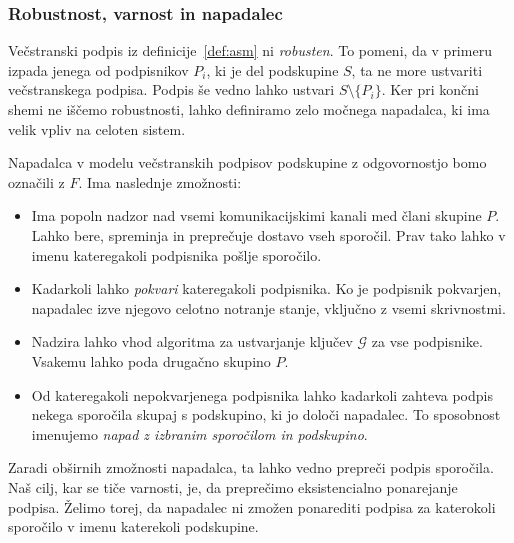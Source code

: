 \documentclass[isrm2, tisk]{fmfdelo}
\begin{document}
\subsubsection{Robustnost, varnost in napadalec}
Večstranski podpis iz definicije~\ref{def:asm} ni \textit{robusten}. To pomeni, da v primeru izpada
jenega od podpisnikov $P_i$, ki je del podskupine $S$, ta ne more ustvariti večstranskega podpisa.
Podpis še vedno lahko ustvari $S \setminus \{P_i\}$. Ker pri končni shemi ne iščemo robustnosti,
lahko definiramo zelo močnega napadalca, ki ima velik vpliv na celoten sistem.
\begin{definicija}
\label{def:asm-napadalec}
    Napadalca v modelu večstranskih podpisov podskupine z odgovornostjo bomo označili z $F$. Ima
    naslednje zmožnosti:
    \begin{itemize}
        \item Ima popoln nadzor nad vsemi komunikacijskimi kanali med člani skupine $P$. Lahko bere,
            spreminja in preprečuje dostavo vseh sporočil. Prav tako lahko v imenu kateregakoli
            podpisnika pošlje sporočilo.
        \item Kadarkoli lahko \textit{pokvari} kateregakoli podpisnika. Ko je podpisnik pokvarjen,
            napadalec izve njegovo celotno notranje stanje, vključno z vsemi skrivnostmi.
        \item Nadzira lahko vhod algoritma za ustvarjanje ključev $\mathcal{G}$ za vse podpisnike.
            Vsakemu lahko poda drugačno skupino $P$.
        \item Od kateregakoli nepokvarjenega podpisnika lahko kadarkoli zahteva podpis nekega sporočila
            skupaj s podskupino, ki jo določi napadalec. To sposobnost imenujemo
            \textit{napad z izbranim sporočilom in podskupino}.
    \end{itemize}
\end{definicija}

Zaradi obširnih zmožnosti napadalca, ta lahko vedno prepreči podpis sporočila. Naš cilj, kar se
tiče varnosti, je, da preprečimo eksistencialno ponarejanje podpisa. Želimo torej, da napadalec ni
zmožen ponarediti podpisa za katerokoli sporočilo v imenu katerekoli podskupine.
\end{document}
